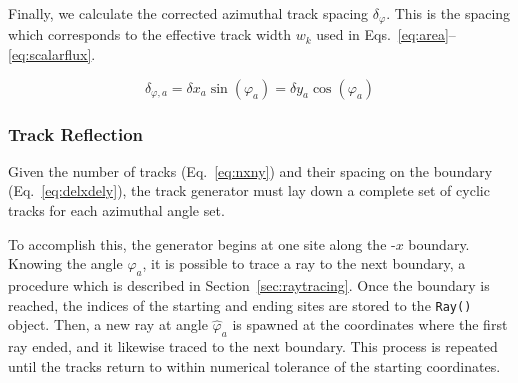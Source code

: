 \documentclass[12pt]{article}
\begin{document}
Finally, we calculate the corrected azimuthal track spacing $\delta_\varphi$. This is the spacing which corresponds to the effective track width $w_k$ used in Eqs.~\ref{eq:area}--\ref{eq:scalarflux}.

\begin{equation}\label{eq:deltavarphi}
\delta_{\varphi,a} = \delta x_a \sin(\varphi_a) = \delta y_a \cos(\varphi_a)
\end{equation}


\subsubsection{Track Reflection}\label{sec:reflection}

Given the number of tracks (Eq.~\ref{eq:nxny}) and their spacing on the boundary (Eq.~\ref{eq:delxdely}), the track generator must lay down a complete set of cyclic tracks for each azimuthal angle set.

To accomplish this, the generator begins at one site along the -$x$ boundary. Knowing the angle $\varphi_a$, it is possible to trace a ray to the next boundary, a procedure which is described in Section~\ref{sec:raytracing}. Once the boundary is reached, the indices of the starting and ending sites are stored to the \texttt{Ray()} object. Then, a new ray at angle $\hat{\varphi}_a$ is spawned at the coordinates where the first ray ended, and it likewise traced to the next boundary. This process is repeated until the tracks return to within numerical tolerance of the starting coordinates.
\end{document}
